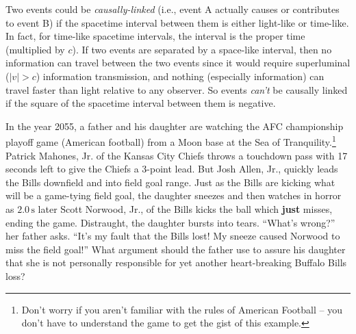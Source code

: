 Two events could be \emph{causally-linked} (i.e., event A actually
causes or contributes to event B) if the spacetime interval between
them is either light-like or time-like.  In fact, for time-like
spacetime intervals, the interval is the proper time (multiplied by $c$).  
If two events are separated by a space-like interval, then no 
information can travel between the two events since it would require 
superluminal ($|v| > c$) information transmission, and nothing 
(especially information) can travel faster than light relative to 
any observer.  So events \emph{can't} be causally linked if the square 
of the spacetime interval between them is negative.


\begin{example}
  In the year 2055, a father and his daughter are watching the AFC
  championship playoff game (American football) 
from a Moon base at the Sea of
  Tranquility.\footnote{Don't worry if you
aren't familiar with the rules of American Football -- you don't have
to understand the game to get the gist of this example.}  Patrick Mahones, Jr. of the Kansas City Chiefs throws a touchdown
pass with 17 seconds left to give the Chiefs  a 3-point lead. But Josh
Allen, Jr., quickly leads the Bills downfield and into field goal
range. Just as the Bills are kicking what will be a game-tying field goal,
   the daughter sneezes and then watches in horror as
  $2.0\,\text{s}$ later Scott Norwood, Jr., of the Bills kicks the ball
  which \textbf{just} misses, ending the game.
   Distraught, the
  daughter bursts into tears. ``What's wrong?'' her father asks.
  ``It's my fault that the Bills lost!  My sneeze caused Norwood to miss
  the field goal!'' What argument should the father use to assure his daughter
  that she is not personally responsible for yet another
  heart-breaking Buffalo Bills loss?  




\end{example}
